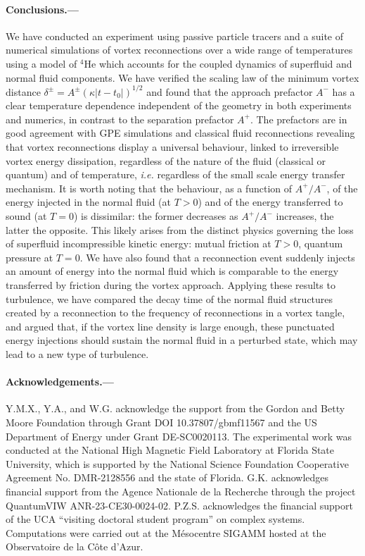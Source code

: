 \documentclass[
  reprint,
superscriptaddress,
 amsmath,amssymb,
 aps,
prb,
]{revtex4-2}
\begin{document}
\paragraph*{Conclusions.---} We have conducted an experiment using passive particle tracers and a suite of numerical simulations of vortex reconnections over a wide range of temperatures using a model of $^4$He which accounts for the coupled dynamics of superfluid and normal fluid components.
We have verified the scaling law of the minimum vortex distance 
$\delta^{\pm}=A^{\pm} (\kappa |t-t_0|)^{1/2}$ and found that the approach prefactor $A^-$ has a clear temperature dependence independent of the geometry in both experiments and numerics, in contrast to the
separation prefactor $A^+$. The prefactors are in good agreement
with GPE simulations \cite{villoisIrreversibleDynamicsVortex2020,allen2014} 
and classical fluid reconnections \cite{yaoSeparationScalingViscous2020}
revealing that vortex reconnections display a universal behaviour, linked to irreversible vortex energy dissipation, regardless of the nature
of the fluid (classical or quantum) and of temperature, \textit{i.e.} regardless of the small scale energy transfer mechanism. 
It is worth noting that the behaviour, as a function of $A^+/A^-$, of 
the energy injected in the normal fluid (at $T>0$) and of the energy transferred to sound (at $T=0$)
\cite{villoisIrreversibleDynamicsVortex2020,leadbeaterSoundEmissionDue2001b} is dissimilar: the former decreases as $A^+/A^-$
increases, the latter the opposite. This likely arises from the distinct physics governing the loss of superfluid 
incompressible kinetic energy: mutual friction at $T>0$, quantum pressure at $T=0$.
We have also found that a reconnection event suddenly injects an amount of energy 
into the normal fluid which is comparable to the energy transferred by friction
during the vortex approach. Applying these results to turbulence, we have
compared the decay time of the normal fluid structures created by a
reconnection to the frequency of reconnections in a vortex tangle, and argued
that, if the vortex line density is large enough, these punctuated
energy injections should sustain the normal fluid in a perturbed state, which may lead to a new type of turbulence.

\paragraph*{Acknowledgements.---} Y.M.X., Y.A., and W.G. acknowledge the support from the Gordon and Betty Moore Foundation through Grant DOI 10.37807/gbmf11567 and the US Department of Energy under Grant DE-SC0020113. The experimental work was conducted at the National High Magnetic Field Laboratory at Florida State University, which is supported by the National Science Foundation Cooperative Agreement No. DMR-2128556 and the state of Florida. G.K. acknowledges financial support from the Agence Nationale de la Recherche through the project QuantumVIW ANR-23-CE30-0024-02. P.Z.S. acknowledges the financial support of the UCA ``visiting doctoral student program'' on complex systems. Computations were carried out at the Mésocentre SIGAMM hosted at the Observatoire de la Côte d’Azur.
\end{document}
